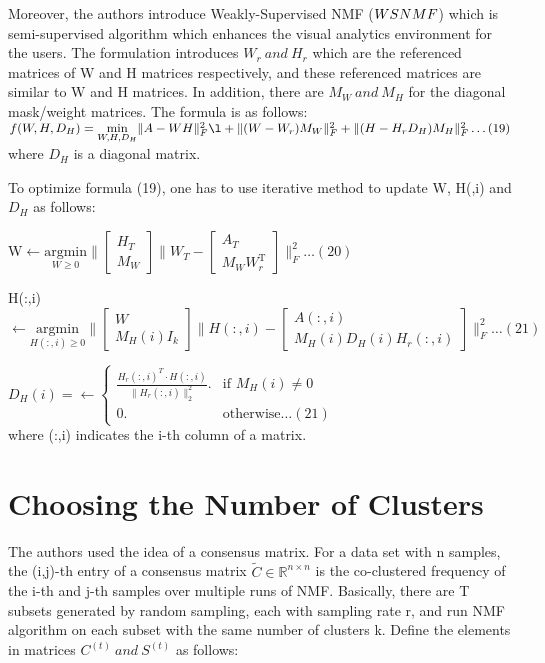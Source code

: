 \documentclass[11pt, oneside]{article}   	%
\begin{document}
\begin{Large}
Moreover, the authors introduce Weakly-Supervised NMF ($WS\-NMF$) which is semi-supervised algorithm which enhances the visual analytics environment for the users.  The formulation introduces $W_{r} \ and \ H_{r}$ which are the referenced matrices of W and H matrices respectively, and these referenced matrices are similar to W and H matrices.  In addition, there are $M_W\ and \ M_{H}$ for the diagonal mask/weight matrices.  The formula is as follows:\\
$f(W,H,D_H)=\underset{W,H,D_H}{\mathrm{min}}\|A-WH\|^{\mathrm{2}}_{F} \l+\|(W-W_r)M_W\|^{\mathrm{2}}_{F} +\|(H-H_rD_H)M_H\|^{\mathrm{2}}_{F}\ldots (19)$ where $D_H$ is a diagonal matrix.

To optimize formula (19), one has to use iterative method to update W, H(,i) and $D_H$ as follows:

W$\leftarrow \underset{W\geq0}{\mathrm{argmin}}\|[{\begin{array}{c}
H_T\\
M_W    
\end{array}}]\|W_T-[{\begin{array}{c}
A_T\\
M_WW^{\mathrm{T}}_{r}    
\end{array}}]\|^{\mathrm{2}}_{F}\ldots (20)$

H(:,i)$\leftarrow \underset{H(:,i)\geq0}{\mathrm{argmin}}\|[{\begin{array}{c}
W\\
M_{H}(i)I_{k}    
\end{array}}]\|H(:,i)-[{\begin{array}{c}
A(:,i)\\
M_{H}(i)D_{H}(i)H_{r}(:,i)    
\end{array}}]\|^{\mathrm{2}}_{F}\ldots (21)$

$D_{H}(i)=\leftarrow\begin{cases} \frac{H_{r}(:,i)^T \cdot H(:,i)}{\|H_{r}(:,i)\|^{\mathrm{2}}_{2}}.    &\text{if \(M_{H}(i)\neq0\)}\\ 0. &\text{otherwise}\ldots (21)\end{cases}$\\
where (:,i) indicates the i-th column of a matrix.

\section{Choosing the Number of Clusters}

The authors used the idea of a consensus matrix.  For a data set with n samples, the (i,j)-th entry of a consensus matrix $\tilde{C}\in\mathbb{R}^{n\times n}$ is the co-clustered frequency of the i-th and j-th samples over multiple runs of NMF.  Basically, there are T subsets generated by random sampling, each with sampling rate r, and run NMF algorithm on each subset with the same number of clusters k.  Define the elements in matrices $C^{(t)} \ and \ S^{(t)}$ as follows:\\


\end{Large}
\end{document}
